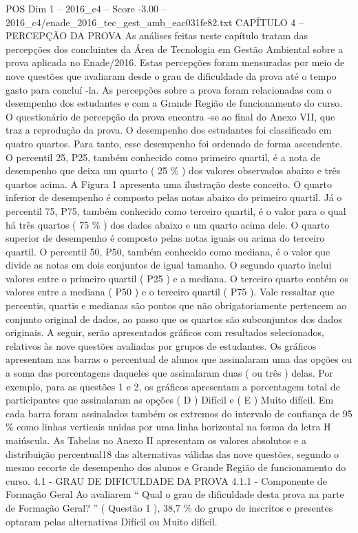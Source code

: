 \begin{textsample}{POS Dim 1 – 2016\_c4 – Score -3.00 – 2016\_c4/enade\_2016\_tec\_gest\_amb\_eac031fe82.txt}  \label{ex:f1_pos_282}
CAPÍTULO 4 – PERCEPÇÃO DA PROVA As análises feitas neste capítulo tratam das percepções dos concluintes da Área de Tecnologia em Gestão Ambiental sobre a prova aplicada no Enade/2016.
Estas percepções foram mensuradas por meio de nove questões que avaliaram desde o grau de dificuldade da prova até o tempo gasto para concluí -la.
As percepções sobre a prova foram relacionadas com o desempenho dos estudantes e com a Grande Região de funcionamento do curso.
O questionário de percepção da prova encontra -se ao final do Anexo VII, que traz a reprodução da prova.
O desempenho dos estudantes foi classificado em quatro quartos.
Para tanto, esse desempenho foi ordenado de forma ascendente.
O percentil 25, P25, também conhecido como primeiro quartil, é a nota de desempenho que deixa um quarto ( 25 \% ) dos valores observados abaixo e três quartos acima.
A Figura 1 apresenta uma ilustração deste conceito.
O quarto inferior de desempenho é composto pelas notas abaixo do primeiro quartil.
Já o percentil 75, P75, também conhecido como terceiro quartil, é o valor para o qual há três quartos ( 75 \% ) dos dados abaixo e um quarto acima dele.
O quarto superior de desempenho é composto pelas notas iguais ou acima do terceiro quartil.
O percentil 50, P50, também conhecido como mediana, é o valor que divide as notas em dois conjuntos de igual tamanho.
O segundo quarto inclui valores entre o primeiro quartil ( P25 ) e a mediana.
O terceiro quarto contém os valores entre a mediana ( P50 ) e o terceiro quartil ( P75 ).
Vale ressaltar que percentis, quartis e medianas são pontos que não obrigatoriamente pertencem ao conjunto original de dados, ao passo que os quartos são subconjuntos dos dados originais.
A seguir, serão apresentados gráficos com resultados selecionados, relativos às nove questões avaliadas por grupos de estudantes.
Os gráficos apresentam nas barras o percentual de alunos que assinalaram uma das opções ou a soma das porcentagens daqueles que assinalaram duas ( ou três ) delas.
Por exemplo, para as questões 1 e 2, os gráficos apresentam a porcentagem total de participantes que assinalaram as opções ( D ) Difícil e ( E ) Muito difícil.
Em cada barra foram assinalados também os extremos do intervalo de confiança de 95 \% como linhas verticais unidas por uma linha horizontal na forma da letra H maiúscula.
As Tabelas no Anexo II apresentam os valores absolutos e a distribuição percentual18 das alternativas válidas das nove questões, segundo o mesmo recorte de desempenho dos alunos e Grande Região de funcionamento do curso. 4.1 - GRAU DE DIFICULDADE DA PROVA 4.1.1 - Componente de Formação Geral Ao avaliarem “ Qual o grau de dificuldade desta prova na parte de Formação Geral? ” ( Questão 1 ), 38,7 \% do grupo de inscritos e presentes optaram pelas alternativas Difícil ou Muito difícil.

\end{textsample}
